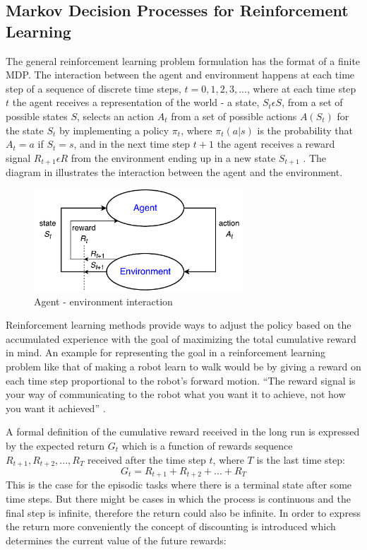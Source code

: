 \subsection{Markov Decision Processes for Reinforcement Learning}
The general reinforcement learning problem formulation has the format of a finite MDP. The interaction between the agent and environment happens at each time step of a sequence of discrete time steps, $t=0,1,2,3,...$, where at each time step $t$ the agent receives a representation of the world - a state, $S_{t}\epsilon S$, from a set of possible states $S$, selects an action $A_{t}$ from a set of possible actions $A(S_{t})$ for the state $S_{t}$ by implementing a policy $\pi_{t}$, where $\pi_{t}(a|s)$ is the probability that $A_{t}=a$ if $S_{t}=s$, and in the next time step $t+1$ the agent receives a reward signal $R_{t+1}\epsilon R$ from the environment ending up in a new state $S_{t+1}$ \cite{Sutton}. The diagram in  illustrates the interaction between the agent and the environment.
\begin{figure}[H]
	\centering
	\includegraphics[width=0.7\textwidth]{Figures/Agent-EnvironmentInteraction}
	\caption{Agent - environment interaction}
	\label{fig:AgentEnv}
\end{figure}
Reinforcement learning methods provide ways to adjust the policy based on the accumulated experience with the goal of maximizing the total cumulative reward in mind. An example for representing the goal in a reinforcement learning problem like that of making a robot learn to walk would be by giving a reward on each time step proportional to the robot's forward motion. “The reward signal is your way of communicating to the robot what you want it to achieve, not how you want it achieved” \cite{Sutton}.

A formal definition of the cumulative reward received in the long run is expressed by the expected return $G_{t}$ which is a function of rewards sequence $R_{t+1},R_{t+2},...,R_{T}$ received after the time step $t$, where $T$ is the last time step:\begin{equation}
G_{t}=R_{t+1}+R_{t+2}+...+R_{T}
\end{equation}
This is the case for the episodic tasks where there is a terminal state after some time steps. But there might be cases in which the process is continuous and the final step is infinite, therefore the return could also be infinite. In order to express the return more conveniently the concept of discounting is introduced which determines the current value of the future rewards:

